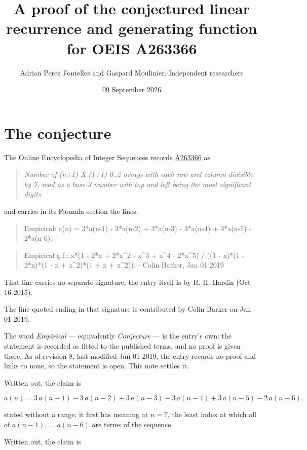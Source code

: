 \documentclass[11pt]{article}
\title{A proof of the conjectured linear recurrence and generating function for OEIS A263366}
\author{Adrian Perez Fontelles and Gaspard Moulinier, Independent researchers}
\date{09 September 2026}
\theoremstyle{definition}
\begin{document}
\maketitle
\section{The conjecture}

The Online Encyclopedia of Integer Sequences records \href{https://oeis.org/A263366}{A263366} as

\begin{quote}\itshape Number of (n+1) X (1+1) 0..2 arrays with each row and column divisible by 7, read as a base-3 number with top and left being the most significant digits\end{quote}

and carries in its Formula section the lines:

\begin{quote}\ttfamily Empirical: a(n) = 3*a(n-1) - 3*a(n-2) + 3*a(n-3) - 3*a(n-4) + 3*a(n-5) - 2*a(n-6).\end{quote}

\begin{quote}\ttfamily Empirical g.f.: x*(1 - 2*x + 2*x\textasciicircum{}2 - x\textasciicircum{}3 + x\textasciicircum{}4 - 2*x\textasciicircum{}5) / ((1 - x)*(1 - 2*x)*(1 - x + x\textasciicircum{}2)*(1 + x + x\textasciicircum{}2)). - Colin Barker, Jan 01 2019\end{quote}

That line carries no separate signature; the entry itself is by R. H. Hardin (Oct 16 2015).

The line quoted ending in that signature is contributed by Colin Barker on Jan 01 2019.

The word {\itshape Empirical} --- equivalently {\itshape Conjecture} --- is the entry's own: the statement is recorded as fitted to the published terms, and no proof is given there. As of revision 8, last modified Jan 01 2019, the entry records no proof and links to none, so the statement is open. This note settles it.

Written out, the claim is

\[a(n) = 3\,a(n-1) - 3\,a(n-2) + 3\,a(n-3) - 3\,a(n-4) + 3\,a(n-5) - 2\,a(n-6).\]

stated without a range; it first has meaning at $n = 7$, the least index at which all of $a(n-1),\dots,a(n-6)$ are terms of the sequence.

Written out, the claim is
\end{document}
